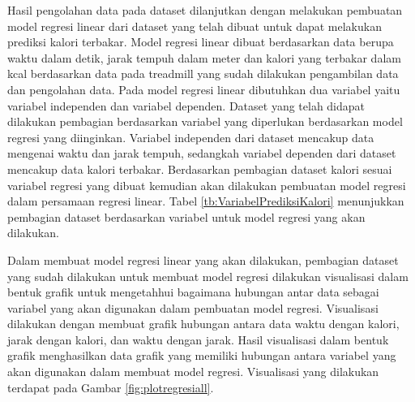 Hasil pengolahan data pada dataset dilanjutkan dengan melakukan pembuatan model regresi linear dari dataset yang telah dibuat untuk dapat melakukan prediksi kalori terbakar. Model regresi linear dibuat berdasarkan data berupa waktu dalam detik, jarak tempuh dalam meter dan kalori yang terbakar dalam kcal berdasarkan data pada treadmill yang sudah dilakukan pengambilan data dan pengolahan data. Pada model regresi linear dibutuhkan dua variabel yaitu variabel independen dan variabel dependen. Dataset yang telah didapat dilakukan pembagian berdasarkan variabel yang diperlukan berdasarkan model regresi yang diinginkan. Variabel independen dari dataset mencakup data mengenai waktu dan jarak tempuh, sedangkah variabel dependen dari dataset mencakup data kalori terbakar. Berdasarkan pembagian dataset kalori sesuai variabel regresi yang dibuat kemudian akan dilakukan pembuatan model regresi dalam persamaan regresi linear. Tabel \ref{tb:VariabelPrediksiKalori} menunjukkan pembagian dataset berdasarkan variabel untuk model regresi yang akan dilakukan. 



Dalam membuat model regresi linear yang akan dilakukan, pembagian dataset yang sudah dilakukan untuk membuat model regresi dilakukan visualisasi dalam bentuk grafik untuk mengetahhui bagaimana hubungan antar data sebagai variabel yang akan digunakan dalam pembuatan model regresi. Visualisasi dilakukan dengan membuat grafik hubungan antara data waktu dengan kalori, jarak dengan kalori, dan waktu dengan jarak. Hasil visualisasi dalam bentuk grafik menghasilkan data grafik yang memiliki hubungan antara variabel yang akan digunakan dalam membuat model regresi. Visualisasi yang dilakukan terdapat pada Gambar \ref{fig:plotregresiall}.

